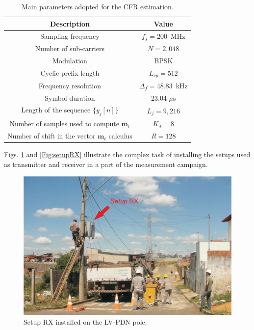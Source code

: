 \documentclass[journal]{IEEEtran}
\begin{document}
\begin{table}[!htp]
\centering
  \caption{Main parameters adopted for the CFR estimation.}
  \label{tab:setup_parameters}
\begin{tabular}{c|c}
\hline\hline
Description&Value\\
\hline\hline
Sampling frequency&$f_s=200$~MHz\\
\hline
Number of sub-carriers  &$N=2,048$ \\
\hline
Modulation         &BPSK \\
\hline
Cyclic prefix length       &$L_{cp}=512$ \\
\hline
Frequency resolution&$\Delta_f = 48.83$~kHz\\
\hline
Symbol duration & 23.04 $\mu$s \\
\hline
Length of the sequence $\{y_{j}[n]\}$    &$L_{j}=9,216$ \\
\hline
Number of samples used to compute $\textbf{m}_{t}$     &$K_{d}=8$ \\
\hline
Number of shift in the vector $\textbf{m}_{t}$  calculus       &$R=128$ \\
\hline
\end{tabular}
\end{table}


Figs. \ref{Fig:setupTX} and \ref{Fig:setupRX} illustrate the complex task of installing the setups used as transmitter and receiver in a part of the measurement campaign.
\begin{figure}[!htp]
	\begin{centering}
		\includegraphics[scale=.4]{Figuras/setupRXnoposte.eps}
		\caption{Setup RX installed on the \ac{LV-PDN} pole.}
       \label{Fig:setupTX}
     \end{centering}
 \end{figure}
 
\end{document}
